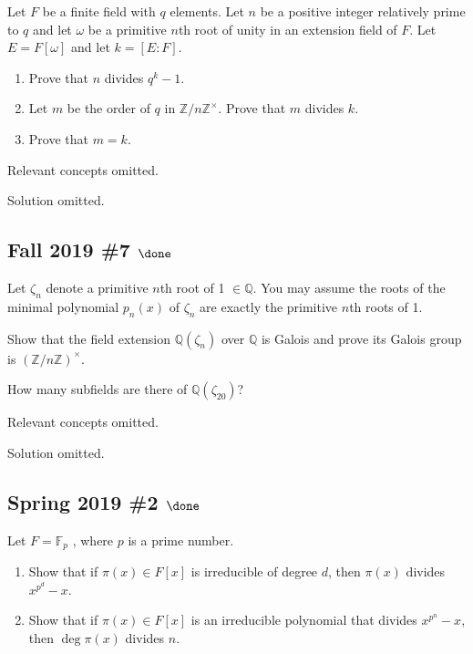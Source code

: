 Let \(F\) be a finite field with \(q\) elements. Let \(n\) be a positive
integer relatively prime to \(q\) and let \(\omega\) be a primitive
\(n\)th root of unity in an extension field of \(F\). Let
\(E = F [\omega]\) and let \(k = [E : F]\).

\begin{enumerate}
\def\labelenumi{\alph{enumi}.}
\item
  Prove that \(n\) divides \(q^{k}-1\).
\item
  Let \(m\) be the order of \(q\) in
  \({\mathbb{Z}}/n{\mathbb{Z}}^{\times}\). Prove that \(m\) divides
  \(k\).
\item
  Prove that \(m = k\).
\end{enumerate}


Relevant concepts omitted.

Solution omitted.

\hypertarget{fall-2019-7-done}{%
\subsection{\texorpdfstring{Fall 2019 \#7
\(\done\)}{Fall 2019 \#7 \textbackslash done}}\label{fall-2019-7-done}}

Let \(\zeta_n\) denote a primitive \(n\)th root of 1
\(\in {\mathbb{Q}}\). You may assume the roots of the minimal polynomial
\(p_n(x)\) of \(\zeta_n\) are exactly the primitive \(n\)th roots of 1.

Show that the field extension \({\mathbb{Q}}(\zeta_n )\) over
\({\mathbb{Q}}\) is Galois and prove its Galois group is
\(({\mathbb{Z}}/n{\mathbb{Z}})^{\times}\).

How many subfields are there of \({\mathbb{Q}}(\zeta_{20} )\)?

Relevant concepts omitted.

Solution omitted.

\hypertarget{spring-2019-2-done}{%
\subsection{\texorpdfstring{Spring 2019 \#2
\(\done\)}{Spring 2019 \#2 \textbackslash done}}\label{spring-2019-2-done}}

Let \(F = {\mathbb{F}}_p\) , where \(p\) is a prime number.

\begin{enumerate}
\def\labelenumi{\alph{enumi}.}
\item
  Show that if \(\pi(x) \in F[x]\) is irreducible of degree \(d\), then
  \(\pi(x)\) divides \(x^{p^d} - x\).
\item
  Show that if \(\pi(x) \in F[x]\) is an irreducible polynomial that
  divides \(x^{p^n} - x\), then \(\deg \pi(x)\) divides \(n\).
\end{enumerate}

